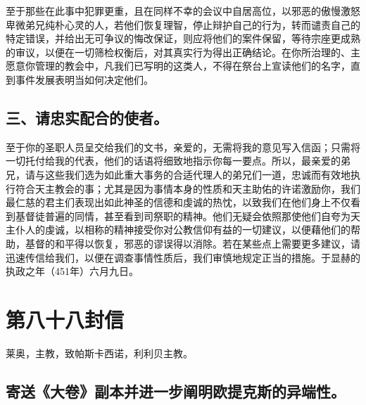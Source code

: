 至于那些在此事中犯罪更重，且在同样不幸的会议中自居高位，以邪恶的傲慢激怒卑微弟兄纯朴心灵的人，若他们恢复理智，停止辩护自己的行为，转而谴责自己的特定错误，并给出无可争议的悔改保证，则应将他们的案件保留，等待宗座更成熟的审议，以便在一切筛检权衡后，对其真实行为得出正确结论。在你所治理的、主愿意你管理的教会中，凡我们已写明的这类人，不得在祭台上宣读他们的名字，直到事件发展表明当如何决定他们。\par


\subsection{三、请忠实配合的使者。}

至于你的圣职人员呈交给我们的文书，亲爱的，无需将我的意见写入信函；只需将一切托付给我的代表，他们的话语将细致地指示你每一要点。所以，最亲爱的弟兄，请与这些我们选为如此重大事务的合适代理人的弟兄们一道，忠诚而有效地执行符合天主教会的事；尤其是因为事情本身的性质和天主助佑的许诺激励你，我们最仁慈的君主们表现出如此神圣的信德和虔诚的热忱，以致我们在他们身上不仅看到基督徒普遍的同情，甚至看到司祭职的精神。他们无疑会依照那使他们自夸为天主仆人的虔诚，以相称的精神接受你对公教信仰有益的一切建议，以便藉他们的帮助，基督的和平得以恢复，邪恶的谬误得以消除。若在某些点上需要更多建议，请迅速传信给我们，以便在调查事情性质后，我们审慎地规定正当的措施。于显赫的执政之年（451年）六月九日。\par



\section{第八十八封信}

莱奥，主教，致帕斯卡西诺，利利贝主教。\par


\subsection{寄送《大卷》副本并进一步阐明欧提克斯的异端性。}

